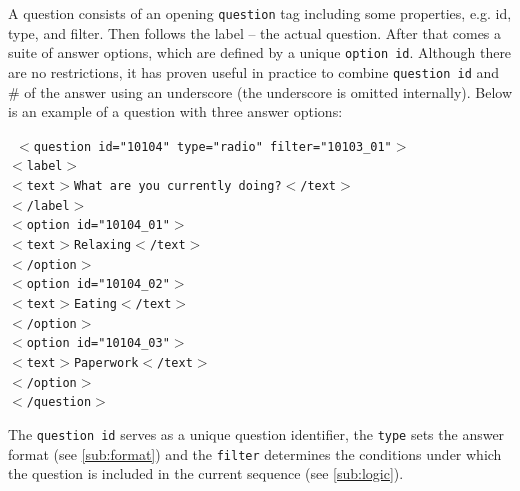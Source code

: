 \documentclass[11pt,a4paper,titlepage]{article}
\begin{document}
A question consists of an opening \texttt{question} tag including some properties, e.g. id, type, and filter. Then follows the label -- the actual question. After that comes a suite of answer options, which are defined by a unique \texttt{option id}. Although there are no restrictions, it has proven useful in practice to combine \texttt{question id} and \# of the answer using an underscore (the underscore is omitted internally). Below is an example of a question with three answer options:
%
\begin{center}
\begin{tcolorbox}[colback=black!10!white,colframe=black!50!white]
\texttt{
$<$question id="10104" type="radio" filter="10103\_01"$>$\\
\hspace*{0.5cm}$<$label$>$\\
\hspace*{0.5cm}$<$text$>$What are you currently doing?$<$/text$>$\\
\hspace*{0.5cm}$<$/label$>$\\
\hspace*{0.5cm}$<$option id="10104\_01"$>$\\
\hspace*{1cm}$<$text$>$Relaxing$<$/text$>$\\
\hspace*{0.5cm}$<$/option$>$\\
\hspace*{0.5cm}$<$option id="10104\_02"$>$\\
\hspace*{1cm}$<$text$>$Eating$<$/text$>$\\
\hspace*{0.5cm}$<$/option$>$\\
\hspace*{0.5cm}$<$option id="10104\_03"$>$\\
\hspace*{1cm}$<$text$>$Paperwork$<$/text$>$\\
\hspace*{0.5cm}$<$/option$>$\\
$<$/question$>$}
\end{tcolorbox}
\end{center}
%
The \texttt{question id} serves as a unique question identifier, the \texttt{type} sets the answer format (see \ref{sub:format}) and the \texttt{filter} determines the conditions under which the question is included in the current sequence (see \ref{sub:logic}).
\end{document}
